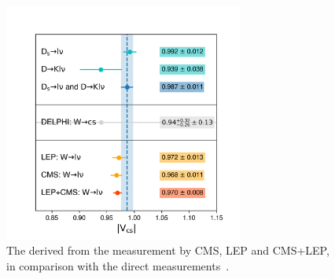  \begin{figure}[!h]
    \centering
    \includegraphics[width=0.7\textwidth]{chapters/Introduction/sectionRelatedWorks/figures/vcs.png}
    \caption{The \absVcs derived from the \BWl measurement by CMS, LEP and CMS+LEP, in comparison with the direct measurements~\cite{pdg2020}.}
    \label{fig:analysis:result:vcs}
\end{figure}














